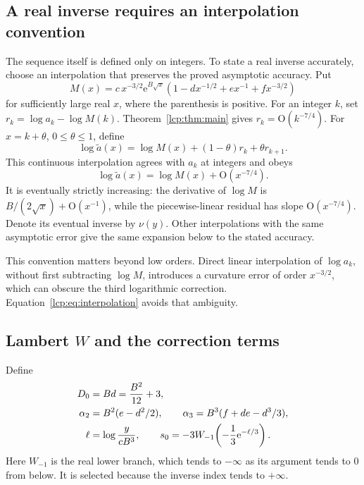 \documentclass[11pt]{article}
\numberwithin{equation}{section}
\theoremstyle{definition}\newtheorem{definition}[theorem]{Definition}
\theoremstyle{remark}\newtheorem{remark}[theorem]{Remark}
\newcommand{\OO}{\mathrm O}
\newcommand{\ee}{\mathrm e}
\begin{document}
\subsection{A real inverse requires an interpolation convention}
The sequence itself is defined only on integers. To state a real inverse
accurately, choose an interpolation that preserves the proved asymptotic
accuracy. Put
\[
 M(x)=c\,x^{-3/2}\ee^{B\sqrt x}
       (1-dx^{-1/2}+ex^{-1}+fx^{-3/2})
\]
for sufficiently large real $x$, where the parenthesis is positive.
For an integer $k$, set $r_k=\log a_k-\log M(k)$.
Theorem~\ref{lcp:thm:main} gives $r_k=\OO(k^{-7/4})$.
For $x=k+\theta$, $0\le\theta\le1$, define
\begin{equation}\label{lcp:eq:interpolation}
 \log\widetilde a(x)=\log M(x)+(1-\theta)r_k+\theta r_{k+1}.
\end{equation}
This continuous interpolation agrees with $a_k$ at integers and obeys
\[
 \log\widetilde a(x)=\log M(x)+\OO(x^{-7/4}).
\]
It is eventually strictly increasing: the derivative of $\log M$ is
$B/(2\sqrt x)+\OO(x^{-1})$, while the piecewise-linear residual has
slope $\OO(x^{-7/4})$. Denote its eventual inverse by $\nu(y)$.
Other interpolations with the same asymptotic error give the same
expansion below to the stated accuracy.

This convention matters beyond low orders. Direct linear interpolation
of $\log a_k$, without first subtracting $\log M$, introduces a curvature
error of order $x^{-3/2}$, which can obscure the third logarithmic
correction. Equation~\eqref{lcp:eq:interpolation} avoids that ambiguity.

\subsection{Lambert \texorpdfstring{$W$}{W} and the correction terms}
Define
\begin{align}\label{lcp:eq:inverseconstants}
 D_0&=Bd=\frac{B^2}{12}+3,\notag\\
 \alpha_2&=B^2(e-d^2/2),\qquad
 \alpha_3=B^3(f+de-d^3/3),\\
 \ell&=\log\frac{y}{cB^3},\qquad
 s_0=-3W_{-1}\!\left(-\frac13\ee^{-\ell/3}\right).\notag
\end{align}
Here $W_{-1}$ is the real lower branch, which tends to $-\infty$ as its
argument tends to $0$ from below. It is selected because the inverse
index tends to $+\infty$.
\end{document}
